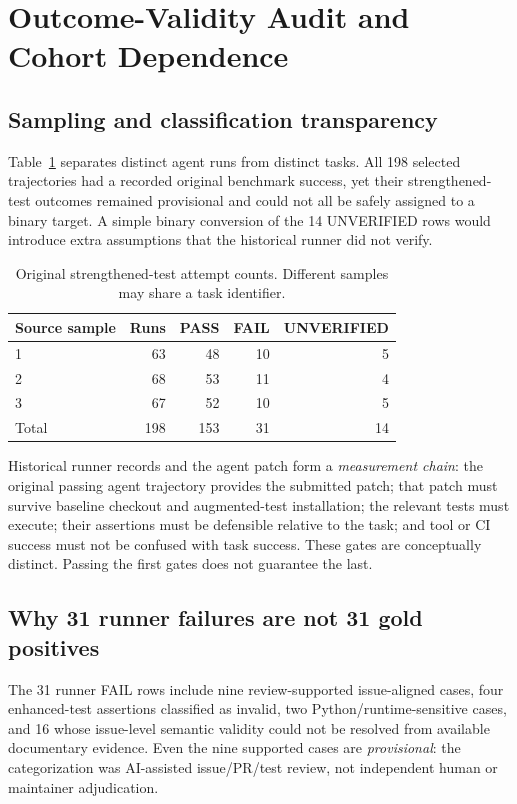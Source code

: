 \section{Outcome-Validity Audit and Cohort Dependence}\label{sec:auditing}
\subsection{Sampling and classification transparency}
Table~\ref{tab:cohort} separates distinct agent runs from distinct tasks. All 198 selected trajectories had a recorded original benchmark success, yet their strengthened-test outcomes remained provisional and could not all be safely assigned to a binary target. A simple binary conversion of the 14 UNVERIFIED rows would introduce extra assumptions that the historical runner did not verify.

\begin{table}[t]
\caption{Original strengthened-test attempt counts. Different samples may share a task identifier.}
\label{tab:cohort}
\centering
\begin{tabular}{lrrrr}
\toprule
Source sample & Runs & PASS & FAIL & UNVERIFIED\\
\midrule
1 & 63 & 48 & 10 & 5\\
2 & 68 & 53 & 11 & 4\\
3 & 67 & 52 & 10 & 5\\
\midrule
Total &198 &153 &31 &14\\
\bottomrule
\end{tabular}
\end{table}

Historical runner records and the agent patch form a \emph{measurement chain}: the original passing agent trajectory provides the submitted patch; that patch must survive baseline checkout and augmented-test installation; the relevant tests must execute; their assertions must be defensible relative to the task; and tool or CI success must not be confused with task success. These gates are conceptually distinct. Passing the first gates does not guarantee the last.

\subsection{Why 31 runner failures are not 31 gold positives}
The 31 runner FAIL rows include nine review-supported issue-aligned cases, four enhanced-test assertions classified as invalid, two Python/runtime-sensitive cases, and 16 whose issue-level semantic validity could not be resolved from available documentary evidence. Even the nine supported cases are \emph{provisional}: the categorization was AI-assisted issue/PR/test review, not independent human or maintainer adjudication.

